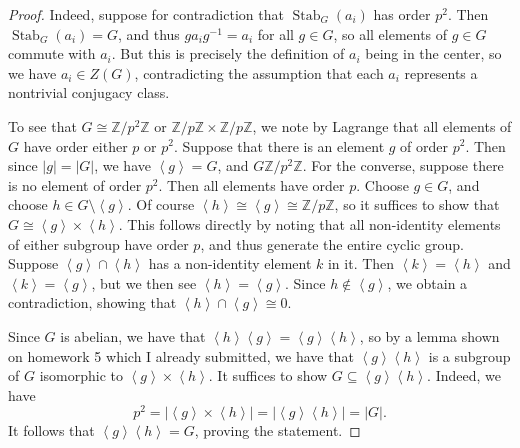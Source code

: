 \documentclass[11pt, letterpaper]{article}
\theoremstyle{plain}
\begin{document}
\begin{proof}
	Indeed, suppose for contradiction that $\operatorname{Stab} _G(a_i)$ has order $p^2$. Then $\operatorname{Stab} _G(a_i)=G$, and thus $ga_ig^{-1} =a_i$ for all $g\in G$, so all elements of $g\in G$ commute with $a_i$. But this is precisely the definition of $a_i$ being in the center, so we have $a_i\in Z(G)$, contradicting the assumption that each $a_i$ represents a nontrivial conjugacy class.

	To see that $G\cong \mathbb{Z} /p^2\mathbb{Z} $ or $\mathbb{Z} /p\mathbb{Z} \times \mathbb{Z} /p\mathbb{Z} $, we note by Lagrange that all elements of $G$ have order either $p$ or $p^2$. Suppose that there is an element $g$ of order $p^2$. Then since $\left| g \right| =\left| G \right| $, we have $\left\langle g \right\rangle =G$, and $G\mathbb{Z} /p^2\mathbb{Z} $. For the converse, suppose there is no element of order $p^2$. Then all elements have order $p$. Choose $g\in G$, and choose $h\in G \setminus \left\langle g \right\rangle $. Of course $\left\langle h \right\rangle \cong \left\langle g \right\rangle \cong \mathbb{Z} /p\mathbb{Z} $, so it suffices to show that $G\cong \left\langle g \right\rangle \times \left\langle h \right\rangle $. This follows directly by noting that all non-identity elements of either subgroup have order $p$, and thus generate the entire cyclic group. Suppose $\left\langle g \right\rangle \cap \left\langle h \right\rangle $ has a non-identity element $k$ in it. Then $\left\langle k \right\rangle =\left\langle h \right\rangle $ and $\left\langle k \right\rangle =\left\langle g \right\rangle $, but we then see $\left\langle h \right\rangle =\left\langle g \right\rangle $. Since $h\notin \left\langle g \right\rangle $, we obtain a contradiction, showing that $\left\langle h \right\rangle \cap \left\langle g \right\rangle \cong 0$.

	Since $G$ is abelian, we have that $\left\langle h \right\rangle \left\langle g \right\rangle =\left\langle g \right\rangle \left\langle h \right\rangle $, so by a lemma shown on homework 5 which I already submitted, we have that $\left\langle g \right\rangle \left\langle h \right\rangle $ is a subgroup of $G$ isomorphic to $\left\langle g \right\rangle \times \left\langle h \right\rangle $. It suffices to show $G\subseteq \left\langle g \right\rangle \left\langle h \right\rangle $. Indeed, we have
	\[
		p^2=\left| \left\langle g \right\rangle \times \left\langle h \right\rangle  \right| =\left| \left\langle g \right\rangle \left\langle h \right\rangle  \right| =\left| G \right| 
	.\]
	It follows that $\left\langle g \right\rangle \left\langle h \right\rangle =G$, proving the statement.
\end{proof}
\end{document}
